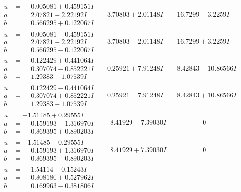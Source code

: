 \documentclass[1p]{elsarticle_modified}
\theoremstyle{definition}
\begin{document}
$$\begin{array}{c|c|c}
\begin{aligned}
u &= \phantom{-}0.005081 + 0.459151 I \\
a &= \phantom{-}2.07821 + 2.22192 I \\
b &= \phantom{-}0.566295 + 0.122067 I\end{aligned}
 & -3.70803 + 2.01148 I & -16.7299 - 3.2259 I \\ \hline\begin{aligned}
u &= \phantom{-}0.005081 - 0.459151 I \\
a &= \phantom{-}2.07821 - 2.22192 I \\
b &= \phantom{-}0.566295 - 0.122067 I\end{aligned}
 & -3.70803 - 2.01148 I & -16.7299 + 3.2259 I \\ \hline\begin{aligned}
u &= \phantom{-}0.122429 + 0.441064 I \\
a &= \phantom{-}0.307074 - 0.852221 I \\
b &= \phantom{-}1.29383 + 1.07539 I\end{aligned}
 & -0.25921 + 7.91248 I & -8.42843 - 10.86566 I \\ \hline\begin{aligned}
u &= \phantom{-}0.122429 - 0.441064 I \\
a &= \phantom{-}0.307074 + 0.852221 I \\
b &= \phantom{-}1.29383 - 1.07539 I\end{aligned}
 & -0.25921 - 7.91248 I & -8.42843 + 10.86566 I \\ \hline\begin{aligned}
u &= -1.51485 + 0.29555 I \\
a &= \phantom{-}0.159193 - 1.316970 I \\
b &= \phantom{-}0.869395 + 0.890203 I\end{aligned}
 & \phantom{-}8.41929 - 7.39030 I & \phantom{-0.000000 } 0 \\ \hline\begin{aligned}
u &= -1.51485 - 0.29555 I \\
a &= \phantom{-}0.159193 + 1.316970 I \\
b &= \phantom{-}0.869395 - 0.890203 I\end{aligned}
 & \phantom{-}8.41929 + 7.39030 I & \phantom{-0.000000 } 0 \\ \hline\begin{aligned}
u &= \phantom{-}1.54114 + 0.15243 I \\
a &= \phantom{-}0.808180 + 0.527962 I \\
b &= \phantom{-}0.169963 - 0.381806 I\end{aligned}

\end{array}$$
\end{document}
